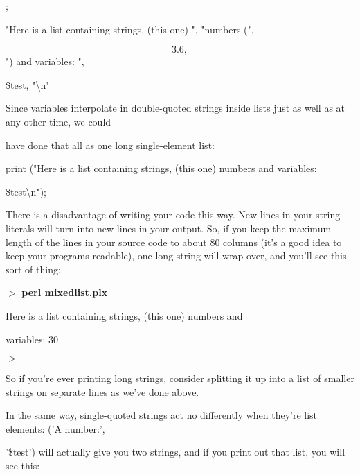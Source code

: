 \documentclass[a4paper,11pt]{book}
\begin{document}
\noindent 

\noindent 

\noindent 

\noindent 

\noindent ;

\noindent 

\noindent "Here is a list containing strings, (this one) ", "numbers (",

\[3.6,\] 
") and variables: ",

\noindent \$test, "\textbackslash n"

\noindent 

\noindent Since variables interpolate in double-quoted strings inside lists just as well as at any other time, we could

\noindent have done that all as one long single-element list:

\noindent 

\noindent 

\noindent print ("Here is a list containing strings, (this one) numbers and variables:

\noindent \$test\textbackslash n");

\noindent 

\noindent There is a disadvantage of writing your code this way. New lines in your string literals will turn into new lines in your output. So, if you keep the maximum length of the lines in your source code to about 80 columns (it's a good idea to keep your programs readable), one long string will wrap over, and you'll see this sort of thing:

\noindent 

\noindent $>$ \textbf{perl mixedlist.plx}

\noindent Here is a list containing strings, (this one) numbers and

\noindent variables: 30

\noindent $>$

\noindent 

\noindent So if you're ever printing long strings, consider splitting it up into a list of smaller strings on separate lines as we've done above.

\noindent 

\noindent In the same way, single-quoted strings act no differently when they're list elements: ('A number:',

\noindent '\$test') will actually give you two strings, and if you print out that list, you will see this:

\noindent 
\end{document}
